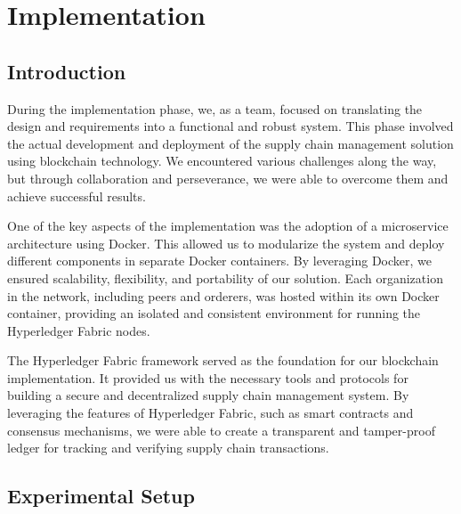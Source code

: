 
\chapter{Implementation}\doublespacing %

\label{Chapter6} %



\section{Introduction}
During the implementation phase, we, as a team, focused on translating the design and requirements into a functional and robust system. This phase involved the actual development and deployment of the supply chain management solution using blockchain technology. We encountered various challenges along the way, but through collaboration and perseverance, we were able to overcome them and achieve successful results.
\par One of the key aspects of the implementation was the adoption of a microservice architecture using Docker. This allowed us to modularize the system and deploy different components in separate Docker containers. By leveraging Docker, we ensured scalability, flexibility, and portability of our solution. Each organization in the network, including peers and orderers, was hosted within its own Docker container, providing an isolated and consistent environment for running the Hyperledger Fabric nodes.
\par The Hyperledger Fabric framework served as the foundation for our blockchain implementation. It provided us with the necessary tools and protocols for building a secure and decentralized supply chain management system. By leveraging the features of Hyperledger Fabric, such as smart contracts and consensus mechanisms, we were able to create a transparent and tamper-proof ledger for tracking and verifying supply chain transactions.



\section{ Experimental Setup}

